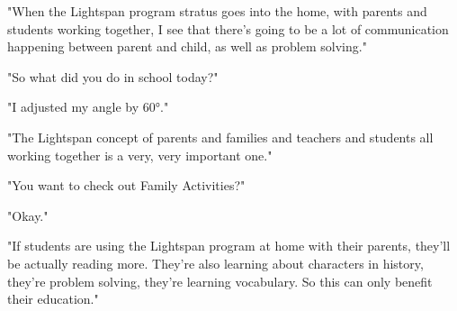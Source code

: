 "When the Lightspan program stratus goes into the home, with parents and students working together, I see that there's going to be a lot of communication happening between parent and child, as well as problem solving."

"So what did you do in school today?"

"I adjusted my angle by 60°."

"The Lightspan concept of parents and families and teachers and students all working together is a very, very important one."

"You want to check out Family Activities?"

"Okay."

"If students are using the Lightspan program at home with their parents, they'll be actually reading more.
They're also learning about characters in history, they're problem solving, they're learning vocabulary.
So this can only benefit their education."
